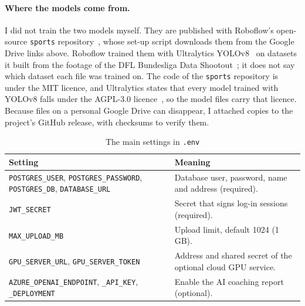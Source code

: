 \paragraph{Where the models come from.} I did not train the two models myself. They are published with Roboflow's open-source \texttt{sports} repository~\cite{roboflowsports}, whose set-up script downloads them from the Google Drive links above. Roboflow trained them with Ultralytics YOLOv8~\cite{yolov8} on datasets it built from the footage of the DFL Bundesliga Data Shootout~\cite{dfl}; it does not say which dataset each file was trained on. The code of the \texttt{sports} repository is under the MIT licence, and Ultralytics states that every model trained with YOLOv8 falls under the AGPL-3.0 licence~\cite{ultralyticslicense}, so the model files carry that licence. Because files on a personal Google Drive can disappear, I attached copies to the project's GitHub release, with checksums to verify them.

\begin{table}[H]
	\centering
	\begin{tabular}{|p{}|p{}|}
		\hline
		\textbf{Setting} & \textbf{Meaning} \\
		\hline
		\texttt{POSTGRES\_\allowbreak{}USER}, \texttt{POSTGRES\_\allowbreak{}PASSWORD}, \texttt{POSTGRES\_DB}, \texttt{DATABASE\_URL} & Database user, password, name and address (required). \\
		\hline
		\texttt{JWT\_SECRET} & Secret that signs log-in sessions (required). \\
		\hline
		\texttt{MAX\_\allowbreak{}UPLOAD\_\allowbreak{}MB} & Upload limit, default 1024 (1\,GB). \\
		\hline
		\texttt{GPU\_\allowbreak{}SERVER\_\allowbreak{}URL}, \texttt{GPU\_\allowbreak{}SERVER\_\allowbreak{}TOKEN} & Address and shared secret of the optional cloud GPU service. \\
		\hline
		\texttt{AZURE\_\allowbreak{}OPENAI\_\allowbreak{}ENDPOINT}, \texttt{\_API\_KEY}, \texttt{\_DEPLOYMENT} & Enable the AI coaching report (optional). \\
		\hline
	\end{tabular}
	\caption{The main settings in \texttt{.env}}
	\label{tab:env}
\end{table}

